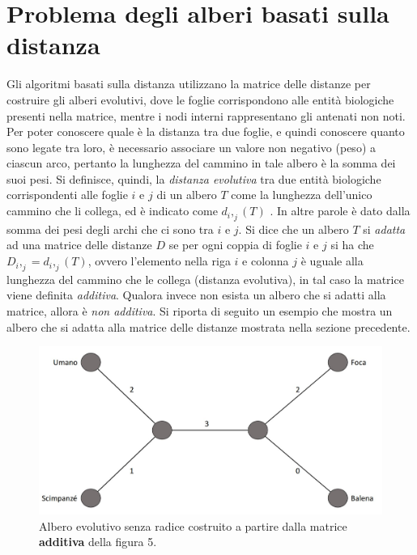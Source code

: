 \section{Problema degli alberi basati sulla distanza}
Gli algoritmi basati sulla distanza utilizzano la matrice delle distanze per costruire gli alberi evolutivi, dove le foglie corrispondono alle entità biologiche presenti nella matrice, mentre i nodi interni rappresentano gli antenati non noti. Per poter conoscere quale è la distanza tra due foglie, e quindi conoscere quanto sono legate tra loro, è necessario associare un valore non negativo (peso) a ciascun arco, pertanto la lunghezza del cammino in tale albero è la somma dei suoi pesi. Si definisce, quindi, la \textit{distanza evolutiva} tra due entità biologiche corrispondenti alle foglie $i$ e $j$ di un albero $T$ come la lunghezza dell'unico cammino che li collega, ed è indicato come $d_i,_j(T)$ \cite{bioinfalganactivelearningapproachparttwo}. In altre parole è dato dalla somma dei pesi degli archi che ci sono tra $i$ e $j$.
\newline
Si dice che un albero $T$ si \textit{adatta} ad una matrice delle distanze $D$ se per ogni coppia di foglie $i$ e $j$ si ha che $D_i,_j=d_i,_j(T)$, ovvero l'elemento nella riga $i$ e colonna $j$ è uguale alla lunghezza del cammino che le collega (distanza evolutiva), in tal caso la matrice viene definita \textit{additiva}. Qualora invece non esista un albero che si adatti alla matrice, allora è \textit{non additiva}.
\newline
Si riporta di seguito un esempio che mostra un albero che si adatta alla matrice delle distanze mostrata nella sezione precedente.
\begin{figure}[h!]
	\includegraphics[width=\linewidth]{unrooted_tree_created_by_figure_5.jpg}
 	\caption{Albero evolutivo senza radice costruito a partire dalla matrice \textbf{additiva} della figura 5.}
  	\label{fig:EvolutionaryTreeExample}
\end{figure}
